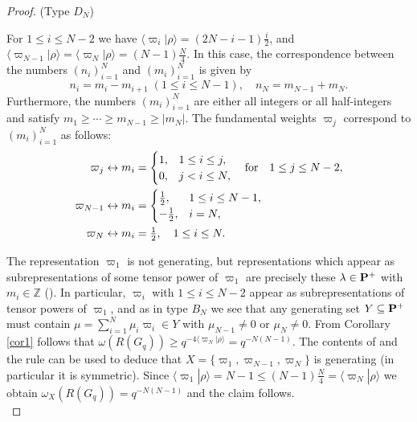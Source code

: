 \documentclass[11 pt, leqno]{amsart}
\newcommand{\ov}{\overline}
\newcommand{\la}{\langle}
\newcommand{\ra}{\rangle}
\newcommand{\ZZ}{\mathbb{Z}}
\theoremstyle{definition}
\numberwithin{equation}{section}
\begin{document}
\begin{proof}
(Type $D_N$) 

For $1\le i \le N-2$ we have $\la \varpi_i |\rho\ra = (2N-i-1)\tfrac{i}{2}$, and $\la \varpi_{N-1}|\rho\ra = \la \varpi_N|\rho\ra=(N-1)\tfrac{N}{4}$. In this case, the correspondence between the numbers $(n_i)_{i=1}^{N}$ and $(m_i)_{i=1}^{N}$ is given by
\[
n_i=m_i-m_{i+1}\;(1\le i \le N-1),\quad
n_N=m_{N-1} + m_{N}.
\]
Furthermore, the numbers $(m_i)_{i=1}^{N}$ are either all integers or all half-integers and satisfy $m_1\ge \cdots \ge m_{N-1}\ge |m_{N}|$. The fundamental weights $\varpi_j$ correspond to $(m_i)_{i=1}^{N}$ as follows:
\begin{equation}\begin{split}\label{eq8}
\varpi_j&\leftrightarrow
m_i=\begin{cases} 
1, & 1\le i \le j,\\
0, & j<i\le N,
\end{cases}
\quad \textnormal{for}\quad 1\le j \le N-2,\\
\varpi_{N-1}&\leftrightarrow m_i=
\begin{cases} \tfrac{1}{2}, & 1\le i \le N-1,\\
-\tfrac{1}{2}, & i=N,
\end{cases}\\
\varpi_N &\leftrightarrow m_i=\tfrac{1}{2},\quad 1\le i\le N.
\end{split}\end{equation}

The representation $\varpi_1$ is not generating, but representations which appear as subrepresentations of some tensor power of $\varpi_1$ are precisely these $\lambda\in \bf{P}^+$ with $m_i\in \ZZ$ (\cite[Proposition 20, page 210]{KlimykSchmudgen}). In particular, $\varpi_i$ with $1\le i \le N-2$ appear as subrepresentations of tensor powers of $\varpi_1$, and as in type $B_N$ we see that any generating set $Y\subseteq \bf{P}^+$ must contain $\mu=\sum_{i=1}^{N}\mu_i \varpi_i\in Y$ with $\mu_{N-1}\neq 0$ or $\mu_N\neq 0$. From Corollary \ref{cor1} follows that $\omega(R(G_q))\ge q^{-4 \la \varpi_N|\rho\ra}=q^{-N(N-1)}$. The contents of \cite[Page272]{BourbakiLie4-6} and the rule \cite[Equation (14) page 210]{KlimykSchmudgen} can be used to deduce that $X=\{\varpi_1,\varpi_{N-1},\varpi_N\}$ is generating (in particular it is symmetric). Since $\la \varpi_1|\rho\ra=N-1\le  (N-1)\tfrac{N}{4}=\la\varpi_N|\rho\ra $ we obtain $\omega_X(R(G_q))=q^{-N(N-1)}$ and the claim follows.\\


\end{proof}
\end{document}

